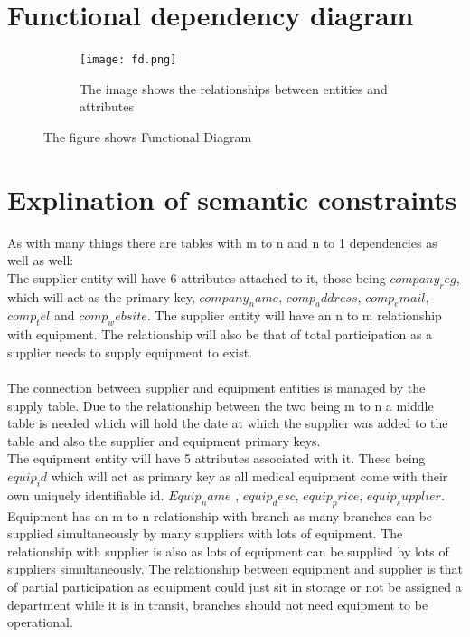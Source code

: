 \documentclass{article}
\begin{document}
\section{Functional dependency diagram}


\begin{figure}[H]
	
	\begin{subfigure}{0.5\textwidth}
		\texttt{[image: fd.png]} 
		\caption{The image shows the relationships between entities and attributes}
		\label{fig:subim2}
	\end{subfigure}
	\caption{The figure shows Functional Diagram}
	\label{fig:image2}
\end{figure}

\pagebreak

\section{Explination of semantic constraints}
As with many things there are tables with m to n and n to 1 dependencies as well as well:\\

The supplier entity will have 6 attributes attached to it, those being $company_reg$, which will act as the primary key, $company_name$, $comp_address$, $comp_email$,$comp_tel$ and $comp_website$.
The supplier entity will have an n to m relationship with equipment. The relationship will also be that of total participation as a supplier needs to supply equipment to exist.\\ \\

The connection between supplier and equipment entities is managed by the supply table. Due to the relationship between the two being m to n a middle table is needed which will hold the date at which the supplier was added to the table and also the supplier and equipment primary keys.\\

The equipment entity will have 5 attributes associated with it. These being $equip_id$ which will act as primary key as all medical equipment come with their own uniquely identifiable id. $Equip_name$ , $equip_desc$, $equip_price$, $equip_supplier$. Equipment has an m to n relationship with branch as many branches can be supplied simultaneously by many suppliers with lots of equipment. The relationship with supplier is also  as lots of equipment can be supplied by lots of suppliers simultaneously. The relationship between equipment and  supplier is that of partial participation as equipment could just sit in storage or not be assigned a department while it is in transit, branches should not need equipment to be operational. \\
\end{document}
